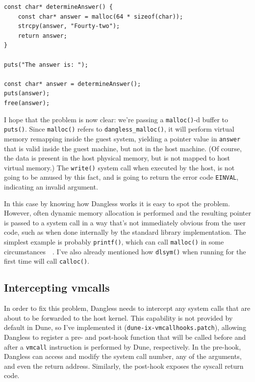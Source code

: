 \begin{lstlisting}
const char* determineAnswer() {
	const char* answer = malloc(64 * sizeof(char));
	strcpy(answer, "Fourty-two");
	return answer;
}

puts("The answer is: ");

const char* answer = determineAnswer();
puts(answer);
free(answer);
\end{lstlisting}

I hope that the problem is now clear: we're passing a \lstinline!malloc()!-d buffer to \lstinline!puts()!. Since \lstinline!malloc()! refers to \lstinline!dangless_malloc()!, it will perform virtual memory remapping inside the guest system, yielding a pointer value in \lstinline!answer! that is valid inside the guest machine, but not in the host machine. (Of course, the data is present in the host physical memory, but is not mapped to host virtual memory.) The \lstinline!write()! system call when executed by the host, is not going to be amused by this fact, and is going to return the error code \texttt{EINVAL}, indicating an invalid argument.

In this case by knowing how Dangless works it is easy to spot the problem. However, often dynamic memory allocation is performed and the resulting pointer is passed to a system call in a way that's not immediately obvious from the user code, such as when done internally by the standard library implementation. The simplest example is probably \lstinline!printf()!, which can call \lstinline!malloc()! in some circumstances~\cite{glibc-printf-malloc}~\cite{glibc-printf-malloc-vulnerability}. I've also already mentioned how \lstinline!dlsym()! when running for the first time will call \lstinline!calloc()!.

\subsection{Intercepting vmcalls}

In order to fix this problem, Dangless needs to intercept any system calls that are about to be forwarded to the host kernel. This capability is not provided by default in Dune, so I've implemented it (\texttt{dune-ix-vmcallhooks.patch}), allowing Dangless to register a pre- and post-hook function that will be called before and after a \lstinline!vmcall! instruction is performed by Dune, respectively. In the pre-hook, Dangless can access and modify the system call number, any of the arguments, and even the return address. Similarly, the post-hook exposes the syscall return code.

